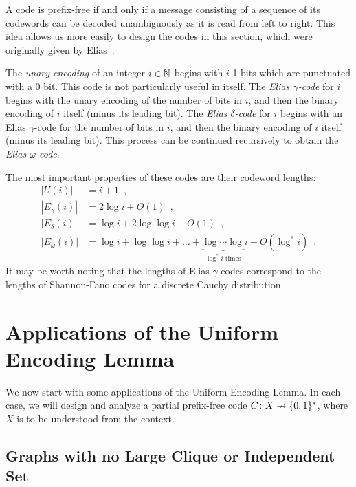 \documentclass{patmorin}
\begin{document}
A code is prefix-free if and only if a message consisting of a
sequence of its codewords can be decoded unambiguously as it is read
from left to right. This idea allows us more easily to design the
codes in this section, which were originally given by
Elias~\cite{elias:coding}.

The \emph{unary encoding} of an integer $i \in \mathbb{N}$ begins with $i$ 1
bits which are punctuated with a 0 bit. This code is not particularly
useful in itself. The \emph{Elias $\gamma$-code} for $i$ begins with
the unary encoding of the number of bits in $i$, and then the binary
encoding of $i$ itself (minus its leading bit). The \emph{Elias
  $\delta$-code} for $i$ begins with an Elias $\gamma$-code for the
number of bits in $i$, and then the binary encoding of $i$ itself
(minus its leading bit). This process can be continued recursively to
obtain the \emph{Elias $\omega$-code}.

The most important properties of these codes are their codeword
lengths:
\begin{align*}
  |U(i)| &= i + 1 \enspace , \tag{Unary code} \\
  |E_\gamma(i)| &= 2 \log i + O(1) \enspace , \tag{Elias $\gamma$-code} \\
  |E_\delta(i)| &= \log i + 2 \log \log i + O(1) \enspace , \tag{Elias $\delta$-code} \\
  |E_\omega(i)| &= \log i + \log \log i + \dots + \underbrace{\log \cdots \log}_{\text{$\log^* i$ times}}i + O(\log^* i) \enspace . \tag{Elias $\omega$-code}
\end{align*}
It may be worth noting that the lengths of Elias $\gamma$-codes
correspond to the lengths of Shannon-Fano codes for a discrete Cauchy
distribution.

\section{Applications of the Uniform Encoding Lemma}

We now start with some applications of the Uniform Encoding Lemma. In
each case, we will design and analyze a partial prefix-free code
$C\colon X\nrightarrow \{0, 1\}^*$, where $X$ is to be understood from
the context.

\subsection{Graphs with no Large Clique or Independent Set}
\end{document}
